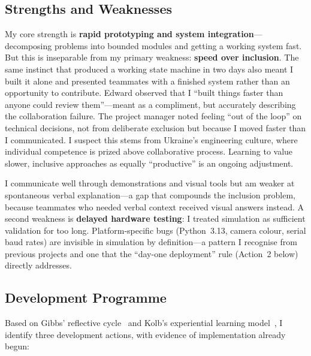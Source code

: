 \subsection{Strengths and Weaknesses}

My core strength is \textbf{rapid prototyping and system integration}---decomposing problems into bounded modules and getting a working system fast. But this is inseparable from my primary weakness: \textbf{speed over inclusion}. The same instinct that produced a working state machine in two days also meant I built it alone and presented teammates with a finished system rather than an opportunity to contribute. Edward observed that I ``built things faster than anyone could review them''---meant as a compliment, but accurately describing the collaboration failure. The project manager noted feeling ``out of the loop'' on technical decisions, not from deliberate exclusion but because I moved faster than I communicated. I suspect this stems from Ukraine's engineering culture, where individual competence is prized above collaborative process. Learning to value slower, inclusive approaches as equally ``productive'' is an ongoing adjustment.

I communicate well through demonstrations and visual tools but am weaker at spontaneous verbal explanation---a gap that compounds the inclusion problem, because teammates who needed verbal context received visual answers instead. A second weakness is \textbf{delayed hardware testing}: I treated simulation as sufficient validation for too long. Platform-specific bugs (Python~3.13, camera colour, serial baud rates) are invisible in simulation by definition---a pattern I recognise from previous projects and one that the ``day-one deployment'' rule (Action~2 below) directly addresses.

\subsection{Development Programme}

Based on Gibbs' reflective cycle~\cite{gibbs1988} and Kolb's experiential learning model~\cite{kolb1984}, I identify three development actions, with evidence of implementation already begun:

